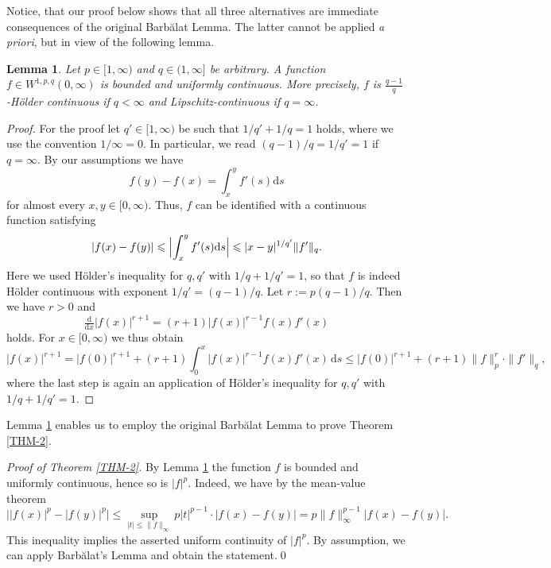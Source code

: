 \documentclass[10pt, a4paper, reqno]{amsart}
\theoremstyle{normal}
\newtheorem{lem}[thm]{Lemma}
\newcommand{\dd}{\mathrm{d}}
\begin{document}
\smallskip

Notice, that our proof below shows that all three alternatives are immediate consequences of the original Barb\u{a}lat Lemma. The latter cannot be applied \emph{a priori}, but in view of the following lemma.

\smallskip

\begin{lem}\label{LEM-3} Let $p\in [1,\infty)$ and $q\in (1,\infty]$ be arbitrary. A function $f\in W^{1,p,q}(0,\infty)$ is bounded and uniformly continuous. More precisely, $f$ is $\frac{q-1}q$-H\"older continuous if $q<\infty$ and Lipschitz-continuous if $q=\infty$.
\end{lem}

\begin{proof} For the proof let $q'\in[1,\infty)$ be such that $1/q'+1/q=1$ holds, where we use the convention $1/\infty=0$. In particular, we read $(q-1)/q=1/q'=1$ if $q=\infty$. By our assumptions we have 
$$
f(y)-f(x)=\int_x^y f'(s)\dd s
$$
for almost every $x,y\in [0,\infty)$. Thus, $f$ can be identified with a continuous function satisfying
$$
	 |f(x)-f(y)|\leqslant \Bigl|\int_x^y f'(s)\dd s\Bigr|\leqslant |x-y|^{1/q'}\|f'\|_q.
$$
Here we used H\"older's inequality for $q,q'$ with $1/q+1/q'=1$, so that $f$ is indeed H\"older continuous with exponent $1/q'=(q-1)/q$. Let $r:=p(q-1)/q$. Then we have $r>0$ and 
$$
\tfrac{\dd}{\dd x}|f(x)|^{r+1}=(r+1)|f(x)|^{r-1}f(x)f'(x)
$$
holds. For $x\in [0,\infty)$ we thus obtain
$$
|f(x)|^{r+1}=|f(0)|^{r+1}+(r+1)\int_0^x|f(x)|^{r-1}f(x)f'(x)\,\dd s
\leqslant |f(0)|^{r+1}+(r+1)\|f\|_p^{r}\cdot \|f'\|_q,
$$ 
where the last step is again an application of H\"older's inequality for $q,q'$ with $1/q+1/q'=1$.
\end{proof}

\smallskip

Lemma \ref{LEM-3} enables us to employ the original Barb\u{a}lat Lemma to prove Theorem \ref{THM-2}.

\bigskip

\emph{Proof of Theorem \ref{THM-2}.}  By Lemma \ref{LEM-3} the function $f$ is bounded and uniformly continuous, hence so is $|f|^p$.  Indeed, we have by the mean-value theorem
		\begin{equation}\label{eq:meanvalue}
	\bigl||f(x)|^p-|f(y)|^p\bigr|\leq 	\sup_{|t|\leqslant \|f\|_\infty}p |t|^{p-1}\cdot |f(x)-f(y)|=p\|f\|_\infty^{p-1}|f(x)-f(y)|.
		\end{equation}
		This inequality implies the asserted uniform continuity of $|f|^p$. By assumption, we can apply Barb\u{a}lat's Lemma and obtain the statement.\hfill\qed
\end{document}

